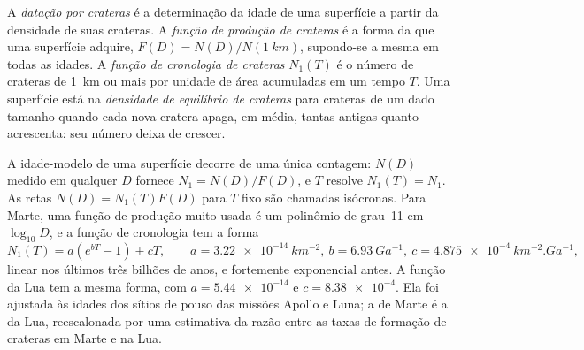 \begin{definition}\label{def:b3:planetary-interiors-surfaces:crater-dating}
A \emph{datação por crateras} é a determinação da idade
de uma superfície a partir da densidade de suas crateras. A \emph{função de produção
de crateras} é a forma da
 que uma superfície adquire, $F(D) =
N(D)/N(\qty{1}{km})$, supondo-se a mesma em todas as idades. A \emph{função de cronologia
de crateras} $N_1(T)$ é o
número de crateras de \qty{1}{km} ou mais por unidade de área acumuladas em um
tempo $T$. Uma superfície está na \emph{densidade de equilíbrio de
crateras} para crateras de um dado
tamanho quando cada nova cratera apaga, em média, tantas antigas quanto acrescenta:
seu número deixa de crescer.
\end{definition}

A idade-modelo de uma superfície decorre de uma única contagem: $N(D)$ medido em qualquer
$D$ fornece $N_1 = N(D)/F(D)$, e $T$ resolve $N_1(T) = N_1$. As retas
$N(D) = N_1(T)F(D)$ para $T$ fixo são chamadas isócronas. Para Marte, uma
função de produção muito usada é um polinômio de grau~11 em $\log_{10}D$, e a
função de cronologia tem a forma
\[
  N_1(T) = a\left(e^{bT} - 1\right) + cT , \qquad
  a = \qty{3.22e-14}{km^{-2}}, \ b = \qty{6.93}{Ga^{-1}}, \
  c = \qty{4.875e-4}{km^{-2}.Ga^{-1}} ,
\]
linear nos últimos três bilhões de anos, e fortemente exponencial antes. A
função da Lua tem a mesma forma, com $a = \num{5.44e-14}$ e $c =
\num{8.38e-4}$. Ela foi ajustada às idades dos sítios de pouso das missões Apollo e Luna;
a de Marte é a da Lua, reescalonada por uma estimativa da razão entre as taxas de
formação de crateras em Marte e na Lua.

